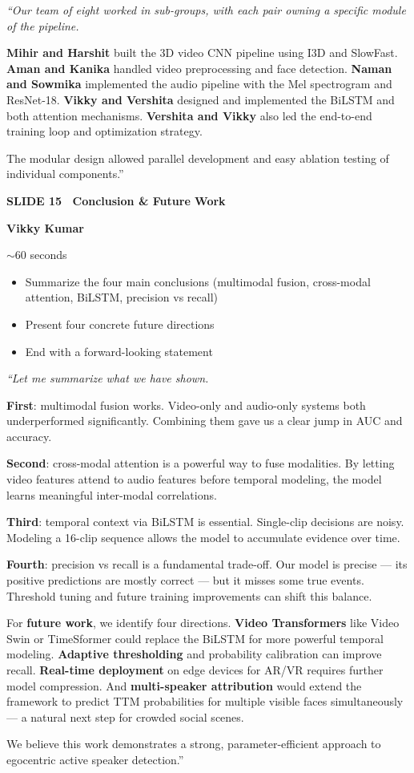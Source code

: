 \documentclass[11pt, a4paper]{article}
\newcommand{\slideheading}[3]{%
  \vspace{0.6cm}
  \begin{tcolorbox}[slidebox]
    \textbf{\color{NavyBlue}SLIDE #1 \textemdash\ #2}\\[2pt]
    \begin{tcolorbox}[presenterbox, title=Presenter(s)]
      \color{AccBlue}\bfseries #3
    \end{tcolorbox}
  \end{tcolorbox}
}
\newcommand{\timing}[1]{%
  \begin{tcolorbox}[timebox, title=Suggested Time]
    \color{AccOrange} #1
  \end{tcolorbox}
}
\newcommand{\keypoints}[1]{%
  \begin{tcolorbox}[keybox, title=Key Points to Cover]
    #1
  \end{tcolorbox}
}
\newcommand{\script}[1]{%
  \begin{mdframed}[
    backgroundcolor=white,
    linecolor=MidText!40,
    linewidth=0.5pt,
    leftmargin=0pt,
    rightmargin=0pt,
    innerleftmargin=10pt,
    innerrightmargin=8pt,
    innertopmargin=8pt,
    innerbottommargin=8pt,
    roundcorner=3pt
  ]
  \itshape\color{MidText}
  #1
  \end{mdframed}
}
\begin{document}
\script{%
``Our team of eight worked in sub-groups, with each pair owning a specific module of the pipeline.

\textbf{Mihir and Harshit} built the 3D video CNN pipeline using I3D and SlowFast.
\textbf{Aman and Kanika} handled video preprocessing and face detection.
\textbf{Naman and Sowmika} implemented the audio pipeline with the Mel spectrogram and ResNet-18.
\textbf{Vikky and Vershita} designed and implemented the BiLSTM and both attention mechanisms.
\textbf{Vershita and Vikky} also led the end-to-end training loop and optimization strategy.

The modular design allowed parallel development and easy ablation testing of individual components.''
}

\slideheading{15}{Conclusion \& Future Work}{Vikky Kumar}

\timing{$\sim$60 seconds}

\keypoints{%
\begin{itemize}[leftmargin=*, itemsep=2pt]
  \item Summarize the four main conclusions (multimodal fusion, cross-modal attention, BiLSTM, precision vs recall)
  \item Present four concrete future directions
  \item End with a forward-looking statement
\end{itemize}
}

\script{%
``Let me summarize what we have shown.

\textbf{First}: multimodal fusion works. Video-only and audio-only systems both underperformed significantly. Combining them gave us a clear jump in AUC and accuracy.

\textbf{Second}: cross-modal attention is a powerful way to fuse modalities. By letting video features attend to audio features before temporal modeling, the model learns meaningful inter-modal correlations.

\textbf{Third}: temporal context via BiLSTM is essential. Single-clip decisions are noisy. Modeling a 16-clip sequence allows the model to accumulate evidence over time.

\textbf{Fourth}: precision vs recall is a fundamental trade-off. Our model is precise --- its positive predictions are mostly correct --- but it misses some true events. Threshold tuning and future training improvements can shift this balance.

For \textbf{future work}, we identify four directions.
\textbf{Video Transformers} like Video Swin or TimeSformer could replace the BiLSTM for more powerful temporal modeling.
\textbf{Adaptive thresholding} and probability calibration can improve recall.
\textbf{Real-time deployment} on edge devices for AR/VR requires further model compression.
And \textbf{multi-speaker attribution} would extend the framework to predict TTM probabilities for multiple visible faces simultaneously --- a natural next step for crowded social scenes.

We believe this work demonstrates a strong, parameter-efficient approach to egocentric active speaker detection.''
}
\end{document}
